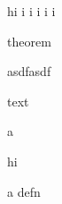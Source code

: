 \documentclass[14pt]{extarticle}
\begin{document}
\start


hi i i i i i

\begin{thm}
	theorem
\end{thm}

\begin{test}
	asdfasdf
\end{test}

text

\begin{test}
	a
\end{test}

\begin{pf}
	hi
\end{pf}

\begin{defn}
	a defn
\end{defn}
\end{document}

